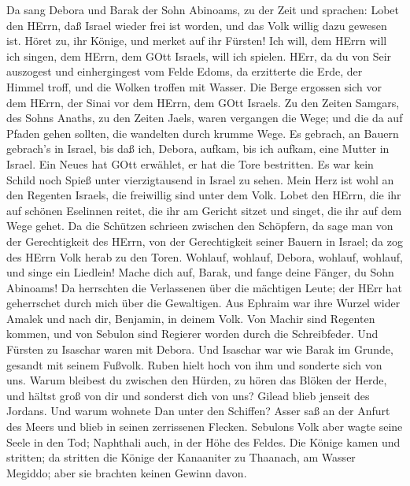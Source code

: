  Da sang Debora und Barak der Sohn Abinoams, zu der Zeit und
sprachen:  Lobet den HErrn, daß Israel wieder frei ist
worden, und das Volk willig dazu gewesen ist.  Höret zu, ihr
Könige, und merket auf ihr Fürsten! Ich will, dem HErrn will ich singen,
dem HErrn, dem GOtt Israels, will ich spielen.  HErr, da du
von Seir auszogest und einhergingest vom Felde Edoms, da erzitterte die
Erde, der Himmel troff, und die Wolken troffen mit Wasser. 
Die Berge ergossen sich vor dem HErrn, der Sinai vor dem HErrn, dem GOtt
Israels.  Zu den Zeiten Samgars, des Sohns Anaths, zu den
Zeiten Jaels, waren vergangen die Wege; und die da auf Pfaden gehen
sollten, die wandelten durch krumme Wege.  Es gebrach, an
Bauern gebrach's in Israel, bis daß ich, Debora, aufkam, bis ich aufkam,
eine Mutter in Israel.  Ein Neues hat GOtt erwählet, er hat
die Tore bestritten. Es war kein Schild noch Spieß unter vierzigtausend
in Israel zu sehen.  Mein Herz ist wohl an den Regenten
Israels, die freiwillig sind unter dem Volk. Lobet den HErrn,
 die ihr auf schönen Eselinnen reitet, die ihr am Gericht
sitzet und singet, die ihr auf dem Wege gehet.  Da die
Schützen schrieen zwischen den Schöpfern, da sage man von der
Gerechtigkeit des HErrn, von der Gerechtigkeit seiner Bauern in Israel;
da zog des HErrn Volk herab zu den Toren.  Wohlauf,
wohlauf, Debora, wohlauf, wohlauf, und singe ein Liedlein! Mache dich
auf, Barak, und fange deine Fänger, du Sohn Abinoams!  Da
herrschten die Verlassenen über die mächtigen Leute; der HErr hat
geherrschet durch mich über die Gewaltigen.  Aus Ephraim
war ihre Wurzel wider Amalek und nach dir, Benjamin, in deinem Volk. Von
Machir sind Regenten kommen, und von Sebulon sind Regierer worden durch
die Schreibfeder.  Und Fürsten zu Isaschar waren mit
Debora. Und Isaschar war wie Barak im Grunde, gesandt mit seinem
Fußvolk. Ruben hielt hoch von ihm und sonderte sich von uns.
 Warum bleibest du zwischen den Hürden, zu hören das Blöken
der Herde, und hältst groß von dir und sonderst dich von uns?
 Gilead blieb jenseit des Jordans. Und warum wohnete Dan
unter den Schiffen? Asser saß an der Anfurt des Meers und blieb in
seinen zerrissenen Flecken.  Sebulons Volk aber wagte seine
Seele in den Tod; Naphthali auch, in der Höhe des Feldes. 
Die Könige kamen und stritten; da stritten die Könige der Kanaaniter zu
Thaanach, am Wasser Megiddo; aber sie brachten keinen Gewinn davon.
